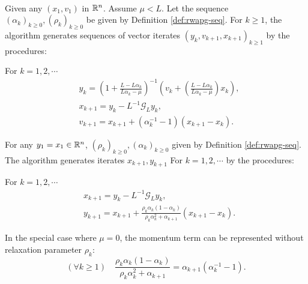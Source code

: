 \documentclass[12pt]{article}
\begin{document}
        \begin{definition}\label{def:r-wapg-st-form} \; \\
            Given any $(x_1, v_1)$ in $\mathbb R^n$. 
            Assume $\mu < L$.
            Let the sequence $(\alpha_k)_{k \ge 0}, (\rho_k)_{k\ge 0}$ be given by Definition \ref{def:rwapg-seq}. 
            For $k \ge 1$, the algorithm generates sequences of vector iterates $(y_k, v_{k + 1}, x_{k + 1})_{k \ge 1}$ by the procedures: 
            \begin{tcolorbox}
                For $k=1, 2, \cdots $
                \begin{align*}
                    & y_k = 
                    \left(
                        1 + \frac{L - L\alpha_k}{L\alpha_k - \mu}
                    \right)^{-1}
                    \left(
                        v_k + 
                        \left(\frac{L - L\alpha_k}{L\alpha_k - \mu} \right) x_k
                    \right), 
                    \\
                    & x_{k + 1} = 
                    y_k - L^{-1} \mathcal G_L y_k, 
                    \\
                    & v_{k + 1} = 
                    x_{k + 1} + (\alpha_k^{-1} -1)(x_{k + 1} - x_k). 
                \end{align*}    
            \end{tcolorbox}
        \end{definition}
        \begin{definition}\label{def:r-wapg-momentum-form}
            For any $y_1 = x_1 \in \mathbb R^n$, $(\rho_k)_{k \ge 0}, (\alpha_k)_{k\ge 0}$ given by Definition \ref{def:rwapg-seq}. 
            The algorithm generates iterates $x_{k + 1}, y_{k + 1}$ For $k = 1, 2, \cdots $ by the procedures: 
            \begin{tcolorbox}
                For $k=1, 2,\cdots $
                \begin{align*}
                    & x_{k + 1} = y_k - L^{-1}\mathcal G_Ly_k, 
                    \\
                    & 
                    y_{k + 1} = 
                    x_{k + 1} + 
                    \frac{\rho_k\alpha_k(1 - \alpha_k)}{\rho_k\alpha_k^2 + \alpha_{k + 1}}(x_{k + 1} - x_k). 
                \end{align*}    
            \end{tcolorbox}
            
            In the special case where $\mu = 0$, the momentum term can be represented without relaxation parameter $\rho_k$: 
            $$
                (\forall k \ge 1)\quad \frac{\rho_k\alpha_k(1 - \alpha_k)}{\rho_k\alpha_k^2 + \alpha_{k + 1}} 
                = \alpha_{k + 1}(\alpha_k^{-1} - 1).  
            $$
        \end{definition}
        \begin{remark}
        \end{remark}
\end{document}
